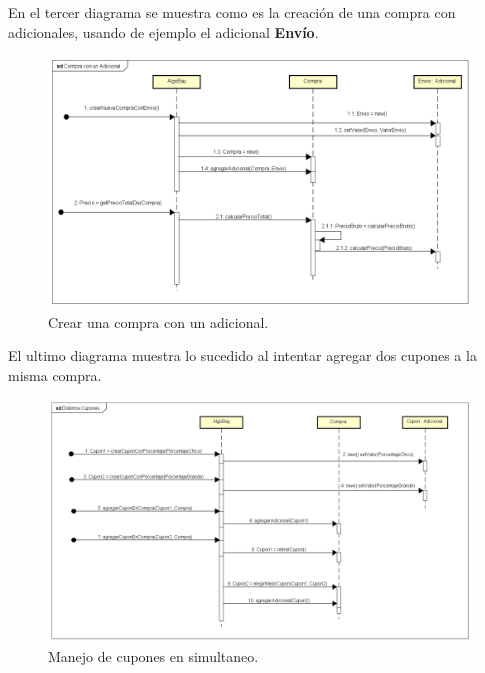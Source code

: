 \documentclass[titlepage,a4paper]{article}
\begin{document}
En el tercer diagrama se muestra como es la creación de una compra con adicionales, usando de ejemplo el adicional \textbf{Envío}.
\begin{figure}[H]
\centering
\includegraphics[width=1\textwidth]{3compraenvio.png} 
\caption{\label{fig:seq03}Crear una compra con un adicional.}
\end{figure}

El ultimo diagrama muestra lo sucedido al intentar agregar dos cupones a la misma compra.
\begin{figure}[H]
\centering
\includegraphics[width=1\textwidth]{4cupones.png} 
\caption{\label{fig:seq04}Manejo de cupones en simultaneo.}
\end{figure}
\end{document}
